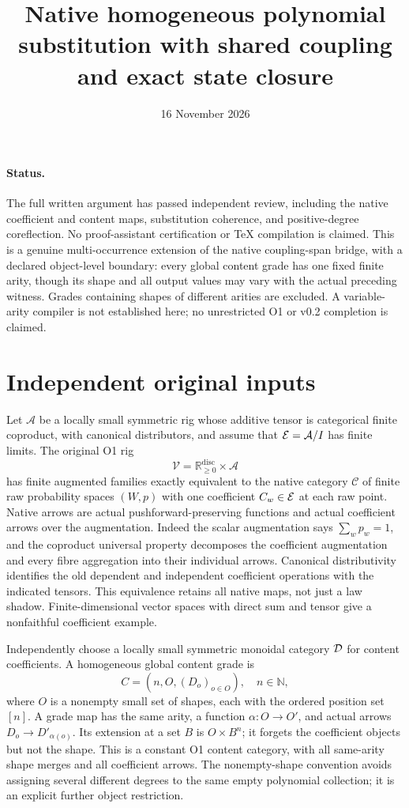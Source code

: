 \documentclass[11pt]{article}
\title{Native homogeneous polynomial substitution with shared coupling and exact state closure}
\date{16 November 2026}
\begin{document}
\maketitle
\paragraph{Status.} The full written argument has passed independent review, including the native coefficient and content maps, substitution coherence, and positive-degree coreflection. No proof-assistant certification or TeX compilation is claimed. This is a genuine multi-occurrence extension of the native coupling-span bridge, with a declared object-level boundary: every global content grade has one fixed finite arity, though its shape and all output values may vary with the actual preceding witness. Grades containing shapes of different arities are excluded. A variable-arity compiler is not established here; no unrestricted O1 or v0.2 completion is claimed.

\section{Independent original inputs}
Let $\mathcal A$ be a locally small symmetric rig whose additive tensor is categorical finite coproduct, with canonical distributors, and assume that $\mathcal E=\mathcal A/I$ has finite limits. The original O1 rig
\[
 \mathcal V=\mathbb R_{\ge0}^{\mathrm{disc}}\times\mathcal A
\]
has finite augmented families exactly equivalent to the native category $\mathcal C$ of finite raw probability spaces $(W,p)$ with one coefficient $C_w\in\mathcal E$ at each raw point. Native arrows are actual pushforward-preserving functions and actual coefficient arrows over the augmentation. Indeed the scalar augmentation says $\sum_wp_w=1$, and the coproduct universal property decomposes the coefficient augmentation and every fibre aggregation into their individual arrows. Canonical distributivity identifies the old dependent and independent coefficient operations with the indicated tensors. This equivalence retains all native maps, not just a law shadow. Finite-dimensional vector spaces with direct sum and tensor give a nonfaithful coefficient example.

Independently choose a locally small symmetric monoidal category $\mathcal D$ for content coefficients. A homogeneous global content grade is
\[
 C=(n,O,(D_o)_{o\in O}),\quad n\in\mathbb N,
\]
where $O$ is a nonempty small set of shapes, each with the ordered position set $[n]$. A grade map has the same arity, a function $\alpha:O\to O'$, and actual arrows $D_o\to D'_{\alpha(o)}$. Its extension at a set $B$ is $O\times B^n$; it forgets the coefficient objects but not the shape. This is a constant O1 content category, with all same-arity shape merges and all coefficient arrows. The nonempty-shape convention avoids assigning several different degrees to the same empty polynomial collection; it is an explicit further object restriction.
\end{document}
